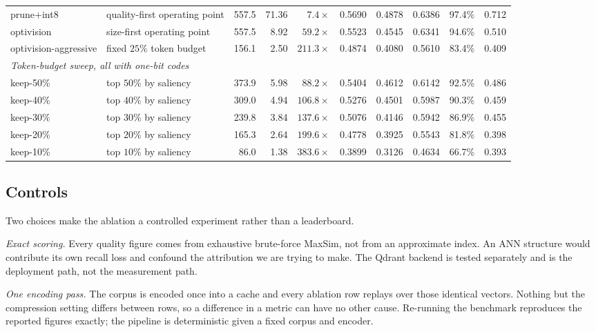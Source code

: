 \documentclass[conference]{IEEEtran}
\begin{document}
\begin{table}[!t]
{\begin{tabular}{@{}llrrrrrrrr@{}}
prune+int8 & quality-first operating point & 557.5 & 71.36 & $7.4\times$ & 0.5690 & 0.4878 & 0.6386 & 97.4\% & 0.712 \\
optivision & size-first operating point & 557.5 & 8.92 & $59.2\times$ & 0.5523 & 0.4545 & 0.6341 & 94.6\% & 0.510 \\
optivision-aggressive & fixed $25\%$ token budget & 156.1 & 2.50 & $211.3\times$ & 0.4874 & 0.4080 & 0.5610 & 83.4\% & 0.409 \\
\midrule
\multicolumn{10}{l}{\textit{Token-budget sweep, all with one-bit codes}} \\
keep-50\% & top $50\%$ by saliency & 373.9 & 5.98 & $88.2\times$ & 0.5404 & 0.4612 & 0.6142 & 92.5\% & 0.486 \\
keep-40\% & top $40\%$ by saliency & 309.0 & 4.94 & $106.8\times$ & 0.5276 & 0.4501 & 0.5987 & 90.3\% & 0.459 \\
keep-30\% & top $30\%$ by saliency & 239.8 & 3.84 & $137.6\times$ & 0.5076 & 0.4146 & 0.5942 & 86.9\% & 0.455 \\
keep-20\% & top $20\%$ by saliency & 165.3 & 2.64 & $199.6\times$ & 0.4778 & 0.3925 & 0.5543 & 81.8\% & 0.398 \\
keep-10\% & top $10\%$ by saliency & 86.0 & 1.38 & $383.6\times$ & 0.3899 & 0.3126 & 0.4634 & 66.7\% & 0.393 \\
\bottomrule
\end{tabular}}
\end{table}

\subsection{Controls}
Two choices make the ablation a controlled experiment rather than a leaderboard.

\emph{Exact scoring.} Every quality figure comes from exhaustive brute-force
MaxSim, not from an approximate index. An ANN structure would contribute its own
recall loss and confound the attribution we are trying to make. The Qdrant
backend is tested separately and is the deployment path, not the measurement
path.

\emph{One encoding pass.} The corpus is encoded once into a cache and every
ablation row replays over those identical vectors. Nothing but the compression
setting differs between rows, so a difference in a metric can have no other
cause. Re-running the benchmark reproduces the reported figures exactly; the
pipeline is deterministic given a fixed corpus and encoder.
\end{document}

